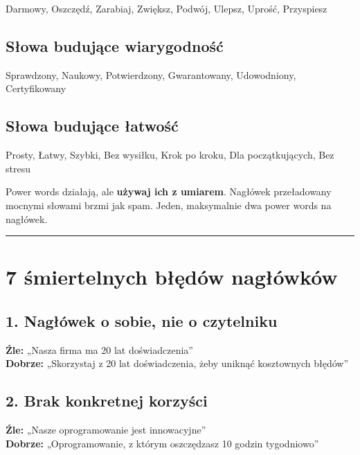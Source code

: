 \documentclass[
  12pt,
  a4paper,
  twoside,
  openright,
  12pt,
  DIV=12,
  BCOR=12mm]{scrbook}
\newcommand{\decoline}{%
  \begin{center}
    \textcolor{bordergray}{\rule{0.3\textwidth}{0.5pt}}
  \end{center}
}
\begin{document}
Darmowy, Oszczędź, Zarabiaj, Zwiększ, Podwój, Ulepsz, Uprość, Przyspiesz

\subsection{Słowa budujące
wiarygodność}\label{sux142owa-budujux105ce-wiarygodnoux15bux107}

Sprawdzony, Naukowy, Potwierdzony, Gwarantowany, Udowodniony,
Certyfikowany

\subsection{Słowa budujące
łatwość}\label{sux142owa-budujux105ce-ux142atwoux15bux107}

Prosty, Łatwy, Szybki, Bez wysiłku, Krok po kroku, Dla początkujących,
Bez stresu

\begin{uwaga}
Power words działają, ale \textbf{używaj ich z umiarem}. Nagłówek przeładowany mocnymi słowami brzmi jak spam. Jeden, maksymalnie dwa power words na nagłówek.
\end{uwaga}

\decoline

\section{7 śmiertelnych błędów
nagłówków}\label{ux15bmiertelnych-bux142ux119duxf3w-nagux142uxf3wkuxf3w}

\subsection{1. Nagłówek o sobie, nie o
czytelniku}\label{nagux142uxf3wek-o-sobie-nie-o-czytelniku}

\textbf{Źle:} „Nasza firma ma 20 lat doświadczenia''\\
\textbf{Dobrze:} „Skorzystaj z 20 lat doświadczenia, żeby uniknąć
kosztownych błędów''

\subsection{2. Brak konkretnej
korzyści}\label{brak-konkretnej-korzyux15bci}

\textbf{Źle:} „Nasze oprogramowanie jest innowacyjne''\\
\textbf{Dobrze:} „Oprogramowanie, z którym oszczędzasz 10 godzin
tygodniowo''
\end{document}
